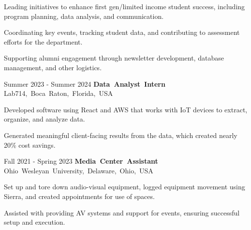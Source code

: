 \documentclass[10pt, letterpaper]{article}
\begin{document}
\vspace{\highlightSpacing}
\begin{onecolentry}
    \begin{highlights}
        \item Leading initiatives to enhance first gen/limited income student success, including program planning, data analysis, and communication.
        \item Coordinating key events, tracking student data, and contributing to assessment efforts for the department.
        \item Supporting alumni engagement through newsletter development, database management, and other logistics.
    \end{highlights}
\end{onecolentry}

\vspace{\entrySpacing}\begin{twocolentry}{Summer 2023 - Summer 2024}
    \mbox{\textbf{Data Analyst Intern}}
    \kern {}
    \AND
    \kern {}
    \mbox{Lab714, Boca Raton, Florida, USA}
\end{twocolentry}

\vspace{\highlightSpacing}
\begin{onecolentry}
    \begin{highlights}
        \item Developed software using React and AWS that works with IoT devices to extract, organize, and analyze data.
        \item Generated meaningful client-facing results from the data, which created nearly 20\% cost savings.
    \end{highlights}
\end{onecolentry}

\vspace{\entrySpacing}\begin{twocolentry}{Fall 2021 - Spring 2023}
    \mbox{\textbf{Media Center Assistant}}
    \kern {}
    \AND
    \kern {}
    \mbox{Ohio Wesleyan University, Delaware, Ohio, USA}
\end{twocolentry}

\vspace{\highlightSpacing}
\begin{onecolentry}
    \begin{highlights}
        \item Set up and tore down audio-visual equipment, logged equipment movement using Sierra, and created appointments for use of spaces.
        \item Assisted with providing AV systems and support for events, ensuring successful setup and execution.
    \end{highlights}
\end{onecolentry}
\end{document}
